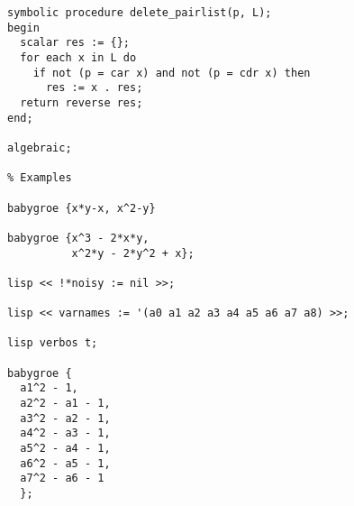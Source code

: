 \begin{code}
\begin{verbatim}
symbolic procedure delete_pairlist(p, L);
begin
  scalar res := {};
  for each x in L do
    if not (p = car x) and not (p = cdr x) then
      res := x . res;
  return reverse res;
end;

algebraic;

% Examples

babygroe {x*y-x, x^2-y}

babygroe {x^3 - 2*x*y,
          x^2*y - 2*y^2 + x};

lisp << !*noisy := nil >>;

lisp << varnames := '(a0 a1 a2 a3 a4 a5 a6 a7 a8) >>;

lisp verbos t;

babygroe {
  a1^2 - 1,
  a2^2 - a1 - 1,
  a3^2 - a2 - 1,
  a4^2 - a3 - 1,
  a5^2 - a4 - 1,
  a6^2 - a5 - 1,
  a7^2 - a6 - 1
  };

\end{verbatim}
\end{code}